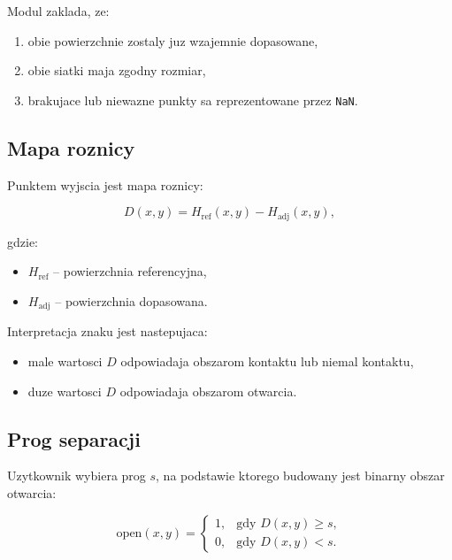 \documentclass[11pt,a4paper]{article}
\begin{document}
Modul zaklada, ze:

\begin{enumerate}[leftmargin=1.5em]
    \item obie powierzchnie zostaly juz wzajemnie dopasowane,
    \item obie siatki maja zgodny rozmiar,
    \item brakujace lub niewazne punkty sa reprezentowane przez \texttt{NaN}.
\end{enumerate}

\subsection{Mapa roznicy}

Punktem wyjscia jest mapa roznicy:

\begin{equation}
    D(x, y) = H_{\mathrm{ref}}(x, y) - H_{\mathrm{adj}}(x, y),
\end{equation}

gdzie:

\begin{itemize}[leftmargin=1.5em]
    \item \(H_{\mathrm{ref}}\) -- powierzchnia referencyjna,
    \item \(H_{\mathrm{adj}}\) -- powierzchnia dopasowana.
\end{itemize}

Interpretacja znaku jest nastepujaca:

\begin{itemize}[leftmargin=1.5em]
    \item male wartosci \(D\) odpowiadaja obszarom kontaktu lub niemal
    kontaktu,
    \item duze wartosci \(D\) odpowiadaja obszarom otwarcia.
\end{itemize}

\subsection{Prog separacji}

Uzytkownik wybiera prog \(s\), na podstawie ktorego budowany jest binarny
obszar otwarcia:

\begin{equation}
    \mathrm{open}(x, y) =
    \begin{cases}
        1, & \text{gdy } D(x, y) \ge s, \\
        0, & \text{gdy } D(x, y) < s.
    \end{cases}
\end{equation}
\end{document}
